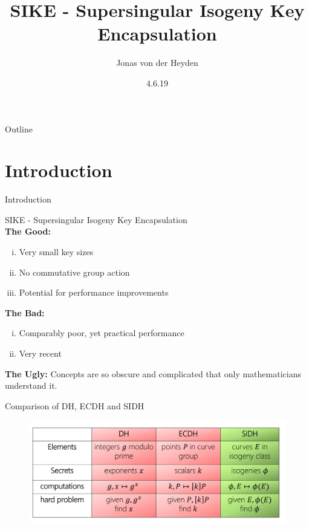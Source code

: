 \documentclass[handout]{beamer}
\title[SIKE]{SIKE - Supersingular Isogeny Key Encapsulation}
\author{Jonas von der Heyden}
\institute{FU Berlin}
\date{4.6.19}
\begin{document}
\newcommand{\source}[1]{\caption*{Source: {#1}} } %
\begin{frame}
  \titlepage
\end{frame}

\begin{frame}{Outline}
  \tableofcontents
\end{frame}

\section{Introduction}

\begin{frame}{Introduction}

SIKE - Supersingular Isogeny Key Encapsulation\\
\vspace{5mm}
\textbf{The Good:}
\begin{enumerate}[(i)]
	\item Very small key sizes\pause
	\item No commutative group action\pause
	\item Potential for performance improvements\pause
\end{enumerate}
\vspace{5mm}
\textbf{The Bad:}
\begin{enumerate}[(i)]
	\item Comparably poor, yet practical performance\pause
	\item Very recent\pause
\end{enumerate}

\vfill
\textbf{The Ugly:} Concepts are so obscure and complicated that only mathematicians understand it.


\end{frame}
\begin{frame}{Comparison of DH, ECDH and SIDH}
\begin{figure} %
	\centering
	\includegraphics[width=1\linewidth]{dh_ec_iso}
	\label{fig:dh_ec_iso}
\end{figure}
\end{frame}
\end{document}

